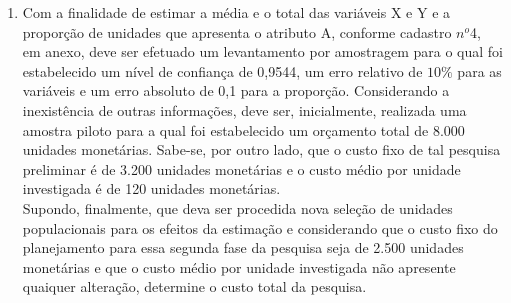 \begin{enumerate}[resume]
\item Com a finalidade de estimar a média e o total das variáveis X e Y e a proporção de unidades que apresenta o atributo A, conforme cadastro $n^o$4, em anexo, deve ser efetuado um levantamento por amostragem para o qual foi estabelecido um nível de confiança de 0,9544, um erro relativo de $10\%$ para as variáveis e um erro absoluto de 0,1 para a proporção. Considerando a inexistência de outras informações, deve ser, inicialmente, realizada uma amostra piloto para a qual foi estabelecido um orçamento total de 8.000 unidades monetárias. Sabe-se, por outro lado, que o custo fixo de tal pesquisa preliminar é de 3.200 unidades monetárias e o custo médio por unidade investigada é de 120 unidades monetárias.\\
Supondo, finalmente, que deva ser procedida nova seleção de unidades populacionais para os efeitos da estimação e considerando que o custo fixo do planejamento para essa segunda fase da pesquisa seja de 2.500 unidades monetárias e que o custo médio por unidade investigada não apresente quaiquer alteração, determine o custo total da pesquisa.

\end{enumerate}